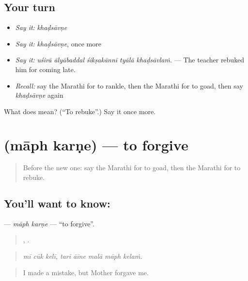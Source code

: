 \subsection*{Your turn}
\begin{itemize}
\raggedright
  \item \emph{Say it:} \emph{khaḍsāvṇe}
  \item \emph{Say it:} \emph{khaḍsāvṇe}, once more
  \item \emph{Say it:} \emph{uśirā ālyābaddal śikṣakānnī tyālā khaḍsāvlaṁ.} — The teacher rebuked him for coming late.
  \item \emph{Recall:} say the Marathi for to rankle, then the Marathi for to goad, then say \emph{khaḍsāvṇe} again
\end{itemize}

\begin{tcolorbox}[breakable,colback=teal!4,colframe=teal!35!black,title={Before you move on}]
What does  mean? (\textquotedblleft{}To rebuke\textquotedblright{}.) Say it once more.
\end{tcolorbox}
\section[\texorpdfstring{\mr{माफ} \mr{करणे} (māph karṇe)}{माफ करणे (māph karṇe)}]{  (māph karṇe) — to forgive}

\label{lesson:MR-C503-maph-karne}



\begin{quote}
Before the new one: say the Marathi for to goad, then the Marathi for to rebuke.
\end{quote}

\subsection*{You'll want to know:  }
\textbf{ } — \emph{māph karṇe} — \textquotedblleft{}to forgive\textquotedblright{}.

\begin{quote}
  ,     .
\end{quote}

\begin{quote}
\emph{mī cūk kelī, tarī āīne malā māph kelaṁ.}
\end{quote}

\begin{quote}
I made a mistake, but Mother forgave me.
\end{quote}

